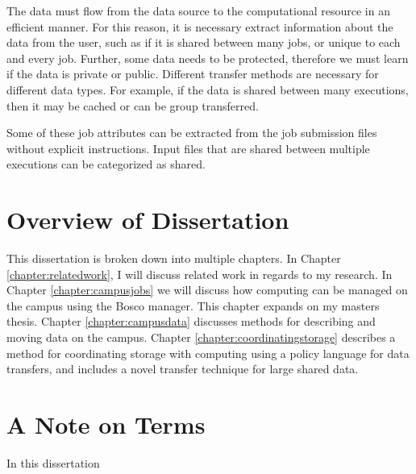 The data must flow from the data source to the computational resource in an efficient manner.  For this reason, it is necessary extract information about the data from the user, such as if it is shared between many jobs, or unique to each and every job.  Further, some data needs to be protected, therefore we must learn if the data is private or public.  Different transfer methods are necessary for different data types.  For example, if the data is shared between many executions, then it may be cached or can be group transferred.  

Some of these job attributes can be extracted from the job submission files without explicit instructions.  Input files that are shared between multiple executions can be categorized as shared.


\section{Overview of Dissertation}

This dissertation is broken down into multiple chapters.  In Chapter \ref{chapter:relatedwork}, I will discuss related work in regards to my research.  In Chapter \ref{chapter:campusjobs} we will discuss how computing can be managed on the campus using the Bosco manager.  This chapter expands on my masters thesis.  Chapter \ref{chapter:campusdata} discusses methods for describing and moving data on the campus.  Chapter \ref{chapter:coordinatingstorage} describes a method for coordinating storage with computing using a policy language for data transfers, and includes a novel transfer technique for large shared data.



\section{A Note on Terms}

In this dissertation 

